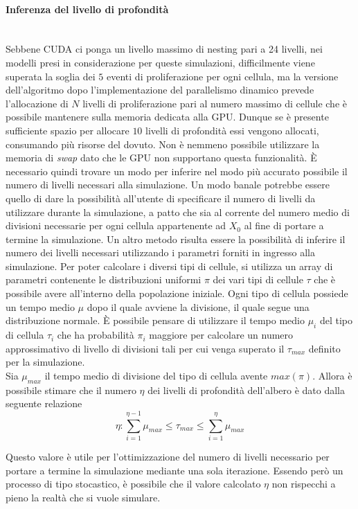 \paragraph{Inferenza del livello di profondità}\mbox{}
\\
Sebbene CUDA ci ponga un livello massimo di nesting pari a 24 livelli,
nei modelli presi in considerazione per queste simulazioni, difficilmente
viene superata la soglia dei $5$ eventi di proliferazione per ogni cellula,
ma la versione dell'algoritmo dopo l'implementazione del parallelismo dinamico
prevede l'allocazione di $N$ livelli di proliferazione pari al numero massimo
di cellule che è possibile mantenere sulla memoria dedicata alla GPU.
Dunque se è presente sufficiente
spazio per allocare $10$ livelli di profondità essi vengono allocati,
consumando più risorse del dovuto. Non è nemmeno possibile utilizzare
la memoria di \textit{swap} dato che le GPU non supportano questa
funzionalità.
È necessario quindi trovare un modo per inferire nel modo più accurato
possibile il numero di livelli necessari alla simulazione.
Un modo banale potrebbe essere quello di dare la possibilità all'utente di
specificare il numero di livelli da utilizzare durante la simulazione,
a patto che sia al corrente del numero medio di divisioni necessarie per ogni cellula
appartenente ad $X_{0}$ al fine di portare a termine la simulazione.
Un altro metodo risulta essere la possibilità di inferire il numero dei livelli
necessari utilizzando i parametri forniti in ingresso alla simulazione.
Per poter calcolare i diversi tipi di cellule, si utilizza un array di
parametri contenente le distribuzioni uniformi $\pi$ dei vari tipi di cellule
$\tau$ che è possibile avere all'interno della popolazione iniziale.
Ogni tipo di cellula possiede un tempo medio $\mu$ dopo il quale avviene
la divisione, il quale segue una distribuzione normale.
È possibile pensare di utilizzare il tempo medio $\mu_{i}$ del tipo di cellula
$\tau_{i}$ che ha probabilità $\pi_{i}$ maggiore per calcolare un numero
approssimativo di livello di divisioni tali per cui venga superato il
$\tau_{max}$ definito per la simulazione.
\\
Sia $\mu_{max}$ il tempo medio di divisione
del tipo di cellula avente $max(\pi)$.
Allora è possibile stimare che il numero $\eta$ dei livelli di profondità
dell'albero è dato dalla seguente relazione
$$\eta : \sum\limits_{i=1}^{\eta - 1}
\mu_{max} \leqslant \tau_{max} \leqslant \sum\limits_{i=1}^{\eta} \mu_{max}$$

Questo valore è utile per l'ottimizzazione del numero di livelli necessario
per portare a termine la simulazione mediante una sola iterazione.
Essendo però un processo di tipo stocastico, è possibile che il valore calcolato
$\eta$ non rispecchi a pieno la realtà che si vuole simulare.

